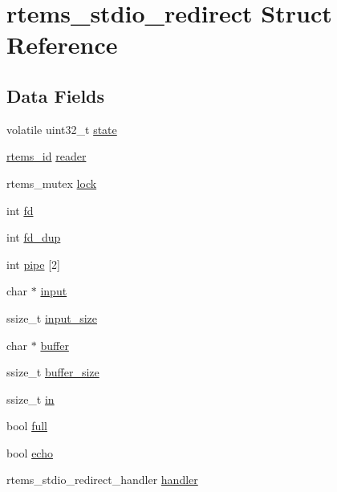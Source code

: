 \hypertarget{structrtems__stdio__redirect}{}\section{rtems\+\_\+stdio\+\_\+redirect Struct Reference}
\label{structrtems__stdio__redirect}
\subsection*{Data Fields}
\begin{DoxyCompactItemize}
\item 
volatile uint32\+\_\+t \mbox{\hyperlink{structrtems__stdio__redirect_a5deea9ef4c0317f6676b1c501bb7b411}{state}}
\item 
\mbox{\hyperlink{group__ClassicTasks_gab20892b814dced7dd4e5b9bf42becd57}{rtems\+\_\+id}} \mbox{\hyperlink{structrtems__stdio__redirect_aaf03aea48f69d68bd632e60041160bb5}{reader}}
\item 
rtems\+\_\+mutex \mbox{\hyperlink{structrtems__stdio__redirect_a53f688863639acc5a1bf46e540bb154d}{lock}}
\item 
int \mbox{\hyperlink{structrtems__stdio__redirect_a7196d4951fd4642c55917c3d0b97b162}{fd}}
\item 
int \mbox{\hyperlink{structrtems__stdio__redirect_ac995b7cbaa89d26b99063a004415deb6}{fd\+\_\+dup}}
\item 
int \mbox{\hyperlink{structrtems__stdio__redirect_a202d760576a46d8501f85deb5b9b1d68}{pipe}} \mbox{[}2\mbox{]}
\item 
char $\ast$ \mbox{\hyperlink{structrtems__stdio__redirect_a20ca2dc909adcedf8c56f1e12fc95822}{input}}
\item 
ssize\+\_\+t \mbox{\hyperlink{structrtems__stdio__redirect_a7beff179cca57ccf20a7647abcdbadf7}{input\+\_\+size}}
\item 
char $\ast$ \mbox{\hyperlink{structrtems__stdio__redirect_adb5157093efc3fdc35e64108788e22e3}{buffer}}
\item 
ssize\+\_\+t \mbox{\hyperlink{structrtems__stdio__redirect_ae4054323ca33325667434420feb6885f}{buffer\+\_\+size}}
\item 
ssize\+\_\+t \mbox{\hyperlink{structrtems__stdio__redirect_a3aab069431f07e353f26ab54bf007bfc}{in}}
\item 
bool \mbox{\hyperlink{structrtems__stdio__redirect_a25415d7bdc05ee05e3a8eb54486fc7bc}{full}}
\item 
bool \mbox{\hyperlink{structrtems__stdio__redirect_a401dc0a438c5618ff4fc8c492591f978}{echo}}
\item 
rtems\+\_\+stdio\+\_\+redirect\+\_\+handler \mbox{\hyperlink{structrtems__stdio__redirect_a8069a1434b31019b440c80e9342d95a1}{handler}}
\end{DoxyCompactItemize}


